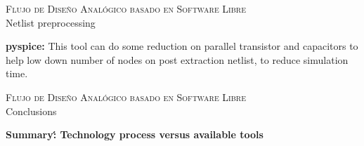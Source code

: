 \documentclass[ps,clariphy]{prosper}
\begin{document}

\begin{slide}{ \textsc{{\tiny Flujo de Dise\~no Anal\'ogico basado en Software Libre}}\\ Netlist preprocessing}
  \vspace{-0.5cm}
  \tiny{
 \textbf{pyspice:} This tool can do some reduction on parallel transistor and capacitors to help low down number of nodes on post extraction netlist, to reduce simulation time. 

	}
\end{slide}


\begin{slide}{ \textsc{{\tiny Flujo de Dise\~no Anal\'ogico basado en Software Libre}}\\ Conclusions}
  \vspace{-0.5cm}
  \tiny{
\textbf{Summary\': Technology process versus available tools} 
    \begin{figure}[ht]
      \centering

    \end{figure}

  	

  }
  
\end{slide}
\end{document}
